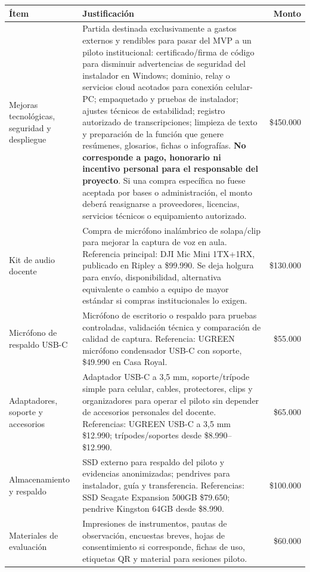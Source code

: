 \documentclass[10pt,letterpaper]{article}
\newcommand{\money}[1]{\$#1}
\begin{document}
\begin{tabularx}{\textwidth}{p{3.55cm}Y R}
\toprule
\textbf{Ítem} & \textbf{Justificación} & \textbf{Monto} \\
\midrule
Mejoras tecnológicas, seguridad y despliegue & Partida destinada exclusivamente a gastos externos y rendibles para pasar del MVP a un piloto institucional: certificado/firma de código para disminuir advertencias de seguridad del instalador en Windows; dominio, relay o servicios cloud acotados para conexión celular-PC; empaquetado y pruebas de instalador; ajustes técnicos de estabilidad; registro autorizado de transcripciones; limpieza de texto y preparación de la función que genere resúmenes, glosarios, fichas o infografías. \textbf{No corresponde a pago, honorario ni incentivo personal para el responsable del proyecto}. Si una compra específica no fuese aceptada por bases o administración, el monto deberá reasignarse a proveedores, licencias, servicios técnicos o equipamiento autorizado. & \money{450.000} \\
\addlinespace
Kit de audio docente & Compra de micrófono inalámbrico de solapa/clip para mejorar la captura de voz en aula. Referencia principal: DJI Mic Mini 1TX+1RX, publicado en Ripley a \money{99.990}. Se deja holgura para envío, disponibilidad, alternativa equivalente o cambio a equipo de mayor estándar si compras institucionales lo exigen. & \money{130.000} \\
\addlinespace
Micrófono de respaldo USB-C & Micrófono de escritorio o respaldo para pruebas controladas, validación técnica y comparación de calidad de captura. Referencia: UGREEN micrófono condensador USB-C con soporte, \money{49.990} en Casa Royal. & \money{55.000} \\
\addlinespace
Adaptadores, soporte y accesorios & Adaptador USB-C a 3,5 mm, soporte/trípode simple para celular, cables, protectores, clips y organizadores para operar el piloto sin depender de accesorios personales del docente. Referencias: UGREEN USB-C a 3,5 mm \money{12.990}; trípodes/soportes desde \money{8.990}--\money{12.990}. & \money{65.000} \\
\addlinespace
Almacenamiento y respaldo & SSD externo para respaldo del piloto y evidencias anonimizadas; pendrives para instalador, guía y transferencia. Referencias: SSD Seagate Expansion 500GB \money{79.650}; pendrive Kingston 64GB desde \money{8.990}. & \money{100.000} \\
\addlinespace
Materiales de evaluación & Impresiones de instrumentos, pautas de observación, encuestas breves, hojas de consentimiento si corresponde, fichas de uso, etiquetas QR y material para sesiones piloto. & \money{60.000} \\

\end{tabularx}
\end{document}
